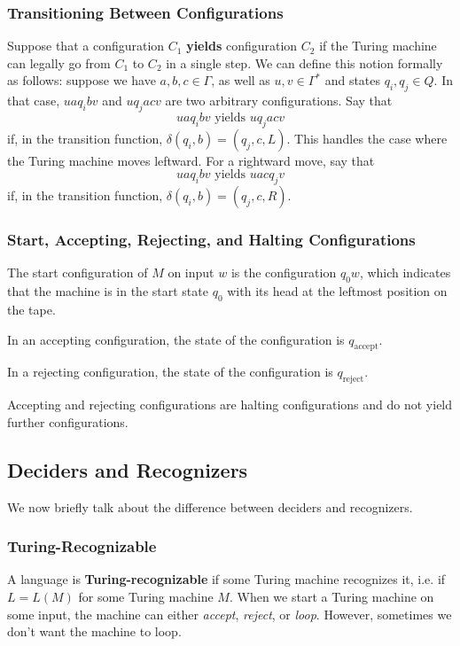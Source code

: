 \documentclass[letterpaper]{article}
\begin{document}
\subsubsection{Transitioning Between Configurations}
Suppose that a configuration $C_1$ \textbf{yields} configuration $C_2$ if the Turing machine can legally go from $C_1$ to $C_2$ in a single step. We can define this notion formally as follows: suppose we have $a, b, c \in \Gamma$, as well as $u, v \in \Gamma^*$ and states $q_i, q_j \in Q$. In that case, $ua q_i bv$ and $uq_j acv$ are two arbitrary configurations. Say that 
\[uaq_i bv \text{ yields } uq_j acv\]
if, in the transition function, $\delta(q_i, b) = (q_j, c, L)$. This handles the case where the Turing machine moves leftward. For a rightward move, say that 
\[uaq_i bv \text{ yields } uacq_j v\]
if, in the transition function, $\delta(q_i, b) = (q_j, c, R)$. 

\subsubsection{Start, Accepting, Rejecting, and Halting Configurations}
The start configuration of $M$ on input $w$ is the configuration $q_0 w$, which indicates that the machine is in the start state $q_0$ with its head at the leftmost position on the tape.

\bigskip 

In an accepting configuration, the state of the configuration is $q_{\text{accept}}$.

\bigskip 

In a rejecting configuration, the state of the configuration is $q_{\text{reject}}$.

\bigskip 

Accepting and rejecting configurations are halting configurations and do not yield further configurations. 

\subsection{Deciders and Recognizers}
We now briefly talk about the difference between deciders and recognizers. 

\subsubsection{Turing-Recognizable}
A language is \textbf{Turing-recognizable} if some Turing machine recognizes it, i.e. if $L = L(M)$ for some Turing machine $M$. When we start a Turing machine on some input, the machine can either \emph{accept}, \emph{reject}, or \emph{loop}. However, sometimes we don't want the machine to loop. 
\end{document}
